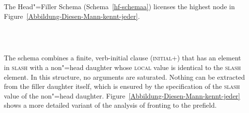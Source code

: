 \noindent
The Head"=Filler Schema (Schema~\ref{hf-schemaa}) licenses the highest node in Figure~\vref{Abbildung-Diesen-Mann-kennt-jeder}.
%
\begin{schema}[Head"=Filler Schema]
\label{hf-schemaa}
~\\[-8pt]\samepage
{} \impl\\
\end{schema}
The schema combines a finite, verb-initial clause (\textsc{initial}+) that has an element in \textsc{slash} with a non"=head daughter whose
\textsc{local} value is identical to the \textsc{slash} element.
In this structure, no arguments are saturated. Nothing can be extracted from the filler daughter itself, which is ensured
by the specification of the \textsc{slash} value of the non"=head daughter. Figure~\ref{Abbildung-Diesen-Mann-kennt-jeder} shows a more detailed
variant of the analysis of fronting to the prefield.
%

